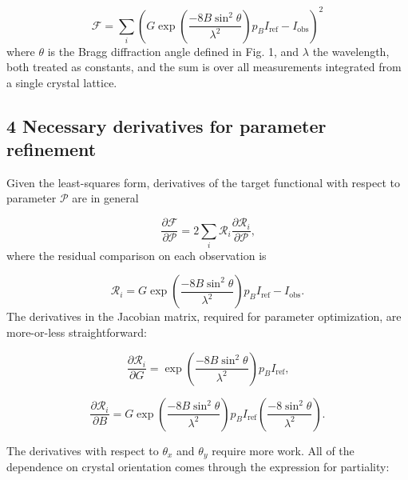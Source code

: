 \documentclass[12pt, letterpaper]{article}
\begin{document}
  
  \begin{equation}
 \mathscr{F} =  \sum_{i} \limits
    ( G  \exp(\dfrac{-8B\sin^2\theta}{\lambda^2}) p_B I_{\mathrm{ref}} - I_{\mathrm{obs}})^{2}
\end{equation}
where $\theta$ is the Bragg diffraction angle defined in Fig. 1, and $\lambda$ the wavelength, both 
treated as constants, and the sum is over all measurements integrated from a single crystal lattice. 

  \subsection*{4 Necessary derivatives for parameter refinement}

  \par Given the least-squares form, derivatives of the target functional with respect to 
  parameter $\mathscr{P}$ are in general
  
    \begin{equation}
    \frac{\partial\mathscr{F}}{\partial\mathscr{P}} = 2\sum_{i} \limits
    \mathscr{R}_i\dfrac{\partial\mathscr{R}_i}{\partial\mathscr{P}}
    \text{,}
    \label{eqn:genFP}
  \end{equation}
where the residual comparison on each observation is 

  \begin{equation}
 \mathscr{R}_i =  
    G  \exp(\dfrac{-8B\sin^2\theta}{\lambda^2}) p_B I_{\mathrm{ref}} - I_{\mathrm{obs}}
    \text{.}
    \end{equation}
The derivatives in the Jacobian matrix, required for parameter optimization, are more-or-less
straightforward:

    \begin{equation}
    \frac{\partial\mathscr{R}_i}{\partial G} = 
    \exp(\dfrac{-8B\sin^2\theta}{\lambda^2}) p_B I_{\mathrm{ref}}
    \text{,}
    \label{eqn:dG}
  \end{equation}

     \begin{equation}
    \frac{\partial\mathscr{R}_i}{\partial B} = 
    G  \exp(\dfrac{-8B\sin^2\theta}{\lambda^2}) p_B I_{\mathrm{ref}}
    \left( \dfrac{-8\sin^2\theta}{\lambda^2}\right)
    \text{.}
    \label{eqn:dB}
  \end{equation}

  \par The derivatives with respect to $\theta_{x}$ and $\theta_{y}$ require more work.  All of the
  dependence on crystal orientation comes through the expression for partiality:
  
\end{document}

